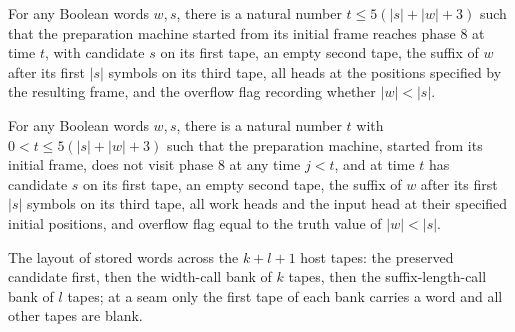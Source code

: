 \begin{lemma}
\label{Turing.FinTM.emitterP2_prepare_run}
\leanok
{}
For any Boolean words $w,s$, there is a natural number $t\le 5(|s|+|w|+3)$ such that the
preparation machine started from its initial frame reaches phase $8$ at time $t$, with
candidate $s$ on its first tape, an empty second tape, the suffix of $w$ after its first
$|s|$ symbols on its third tape, all heads at the positions specified by the resulting
frame, and the overflow flag recording whether $|w|<|s|$.
\end{lemma}

\begin{lemma}
\label{Turing.FinTM.emitterP2_prepare_first}
\leanok
{}
For any Boolean words $w,s$, there is a natural number $t$ with $0<t\le 5(|s|+|w|+3)$
such that the preparation machine, started from its initial frame, does not visit phase
$8$ at any time $j<t$, and at time $t$ has candidate $s$ on its first tape, an empty
second tape, the suffix of $w$ after its first $|s|$ symbols on its third tape, all work
heads and the input head at their specified initial positions, and overflow flag equal
to the truth value of $|w|<|s|$.
\end{lemma}

\begin{definition}
\label{Turing.FinTM.emitterP2Words}
\leanok
{}
The layout of stored words across the $k + l + 1$ host tapes: the preserved
candidate first, then the width-call bank of $k$ tapes, then the
suffix-length-call bank of $l$ tapes; at a seam only the first tape of each
bank carries a word and all other tapes are blank.
\end{definition}

